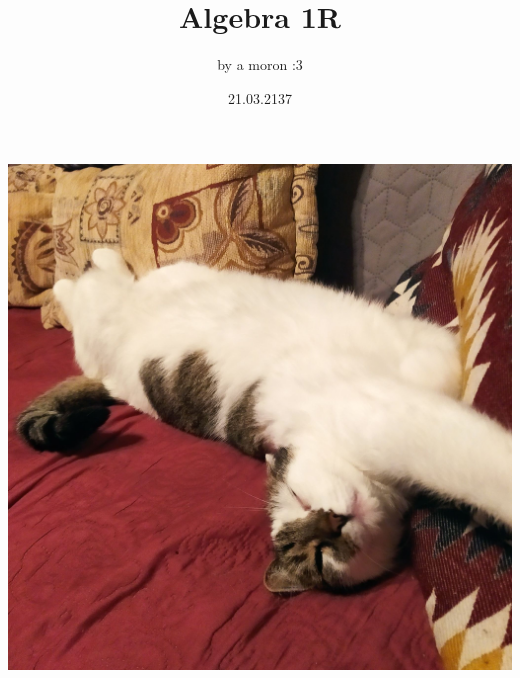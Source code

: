 \documentclass{article}[13pt]
\title {Algebra 1R}
\author{by a moron :3}
\date {21.03.2137}
\begin{document}

\maketitle

\newpage

\begin{center}
    \includegraphics[width=\textwidth]{./kytel.jpg}
\end{center}

\newpage



\newpage



\newpage


\end{document}
